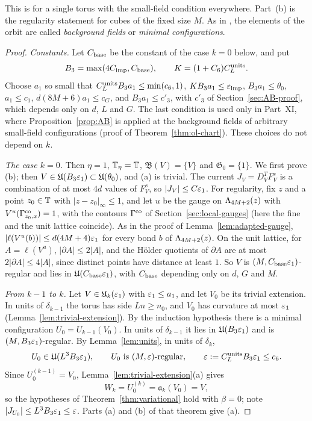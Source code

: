 This is \cite[Theorem~1]{BalVar} for a single torus with the small-field condition everywhere. Part~(b) is the regularity statement \cite[(8)--(10)]{BalVar} for cubes of the fixed size $M$. As in \cite{BalVar}, the elements of the orbit are called \emph{background fields} or \emph{minimal configurations}.

\begin{proof}
\emph{Constants.} Let $C_{\rm base}$ be the constant of the case $k=0$ below, and put
\[
B_3=\max(4C_{\rm imp},C_{\rm base}),\qquad K=(1+C_6)C^{\rm units}_L .
\]
Choose $a_1$ so small that $C^{\rm units}_LB_3a_1\le\min(c_6,1)$, $KB_3a_1\le\varepsilon_{\rm imp}$, $B_3a_1\le\theta_0$, $a_1\le c_1$, $d(8M+6)a_1\le c_G$, and $B_3a_1\le c'_3$, with $c'_3$ of Section~\ref{sec:AB-proof}, which depends only on $d$, $L$ and $G$. The last condition is used only in Part~XI, where Proposition~\ref{prop:AB} is applied at the background fields of arbitrary small-field configurations (proof of Theorem~\ref{thm:ol-chart}). These choices do not depend on $k$.

\emph{The case $k=0$.} Then $\eta=1$, $\mathbb T_\eta=\mathbb T$, $\mathfrak B(V)=\{V\}$ and $\mathfrak G_0=\{1\}$. We first prove (b); then $V\in\mathfrak U(B_3\varepsilon_1)\subset\mathfrak U(\theta_0)$, and (a) is trivial. The current $J_V=D^T_VF^s_V$ is a combination of at most $4d$ values of $F^s_V$, so $|J_V|\le C\varepsilon_1$. For regularity, fix $z$ and a point $z_0\in\mathbb T$ with $|z-z_0|_\infty\le1$, and let $u$ be the gauge on $\Lambda_{4M+2}(z)$ with $V^u(\Gamma^{\rm co}_{z_0,x})=1$, with the contours $\Gamma^{\rm co}$ of Section~\ref{sec:local-gauges} (here the fine and the unit lattice coincide). As in the proof of Lemma~\ref{lem:adapted-gauge}, $|\ell(V^u(b))|\le d(4M+4)\varepsilon_1$ for every bond $b$ of $\Lambda_{4M+2}(z)$. On the unit lattice, for $A=\ell(V^u)$, $|\partial A|\le2|A|$, and the H\"older quotients of $\partial A$ are at most $2|\partial A|\le4|A|$, since distinct points have distance at least $1$. So $V$ is $(M,C_{\rm base}\varepsilon_1)$-regular and lies in $\mathfrak U(C_{\rm base}\varepsilon_1)$, with $C_{\rm base}$ depending only on $d$, $G$ and $M$.

\emph{From $k-1$ to $k$.} Let $V\in\mathfrak U_k(\varepsilon_1)$ with $\varepsilon_1\le a_1$, and let $V_0$ be its trivial extension. In units of $\delta_{k-1}$ the torus has side $Ln\ge n_0$, and $V_0$ has curvature at most $\varepsilon_1$ (Lemma~\ref{lem:trivial-extension}). By the induction hypothesis there is a minimal configuration $U_0=U_{k-1}(V_0)$. In units of $\delta_{k-1}$ it lies in $\mathfrak U(B_3\varepsilon_1)$ and is $(M,B_3\varepsilon_1)$-regular. By Lemma~\ref{lem:units}, in units of $\delta_k$,
\[
U_0\in\mathfrak U(L^3B_3\eps_1),\qquad U_0\ \text{is}\ (M,\eps)\text{-regular},\qquad\eps:=C^{\rm units}_LB_3\eps_1\le c_6 .
\]
Since $U_0^{(k-1)}=V_0$, Lemma~\ref{lem:trivial-extension}(a) gives
\[
W_k=U_0^{(k)}=\mathfrak a_k(V_0)=V ,
\]
so the hypotheses of Theorem~\ref{thm:variational} hold with $\beta=0$; note $|J_{U_0}|\le L^3B_3\varepsilon_1\le\varepsilon$. Parts (a) and (b) of that theorem give (a).


\end{proof}
